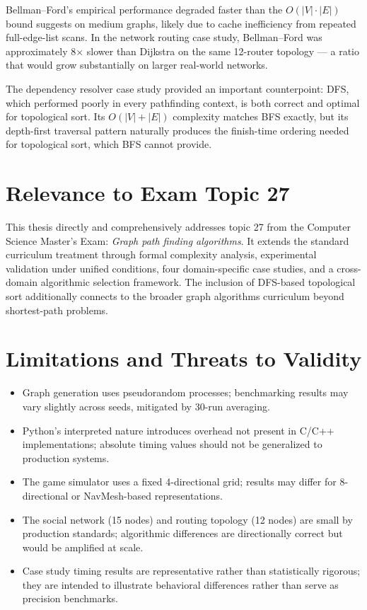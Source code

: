 \documentclass[12pt, a4paper, oneside]{report}
\theoremstyle{definition}
\begin{document}
Bellman–Ford's empirical performance degraded faster than the $O(|V| \cdot |E|)$ bound suggests on medium graphs, likely due to cache inefficiency from repeated full-edge-list scans. In the network routing case study, Bellman–Ford was approximately 8$\times$ slower than Dijkstra on the same 12-router topology — a ratio that would grow substantially on larger real-world networks.

The dependency resolver case study provided an important counterpoint: DFS, which performed poorly in every pathfinding context, is both correct and optimal for topological sort. Its $O(|V|+|E|)$ complexity matches BFS exactly, but its depth-first traversal pattern naturally produces the finish-time ordering needed for topological sort, which BFS cannot provide.

\section{Relevance to Exam Topic 27}

This thesis directly and comprehensively addresses topic 27 from the Computer Science Master's Exam: \textit{Graph path finding algorithms}. It extends the standard curriculum treatment through formal complexity analysis, experimental validation under unified conditions, four domain-specific case studies, and a cross-domain algorithmic selection framework. The inclusion of DFS-based topological sort additionally connects to the broader graph algorithms curriculum beyond shortest-path problems.

\section{Limitations and Threats to Validity}

\begin{itemize}
    \item Graph generation uses pseudorandom processes; benchmarking results may vary slightly across seeds, mitigated by 30-run averaging.
    \item Python's interpreted nature introduces overhead not present in C/C++ implementations; absolute timing values should not be generalized to production systems.
    \item The game simulator uses a fixed 4-directional grid; results may differ for 8-directional or NavMesh-based representations.
    \item The social network (15 nodes) and routing topology (12 nodes) are small by production standards; algorithmic differences are directionally correct but would be amplified at scale.
    \item Case study timing results are representative rather than statistically rigorous; they are intended to illustrate behavioral differences rather than serve as precision benchmarks.
\end{itemize}
\end{document}
